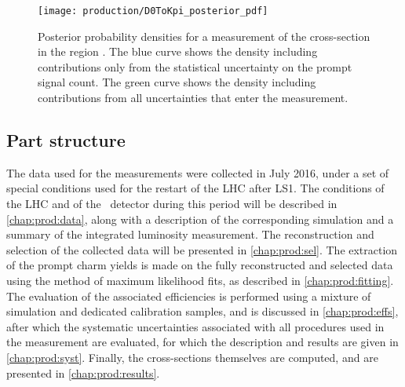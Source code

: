\begin{figure}
  \centering
  \texttt{[image: production/D0ToKpi\_posterior\_pdf]}
  \caption{%
    Posterior probability densities for a measurement of the \PDzero 
    cross-section in the region .
    The blue curve shows the density including contributions only from the 
    statistical uncertainty on the prompt signal count.
    The green curve shows the density including contributions from all 
    uncertainties that enter the measurement.
  }
  \label{fig::prod:introduction:uncertainties:posterior}
\end{figure}

\subsection{Part structure}
\label{chap:prod:introduction:structure}

The data used for the measurements were collected in July 2016, under a set of 
special conditions used for the restart of the \ac{LHC} after \ac{LS1}.
The conditions of the \ac{LHC} and of the \lhcb\ detector during this period 
will be described in \cref{chap:prod:data}, along with a description of the 
corresponding simulation and a summary of the integrated luminosity 
measurement.
The reconstruction and selection of the collected data will be presented in 
\cref{chap:prod:sel}.
The extraction of the prompt charm yields is made on the fully reconstructed 
and selected data using the method of maximum likelihood fits, as described in 
\cref{chap:prod:fitting}.
The evaluation of the associated efficiencies is performed using a mixture of 
simulation and dedicated calibration samples, and is discussed in 
\cref{chap:prod:effs}, after which the systematic uncertainties associated with 
all procedures used in the measurement are evaluated, for which the description 
and results are given in \cref{chap:prod:syst}.
Finally, the cross-sections themselves are computed, and are presented in 
\cref{chap:prod:results}.
